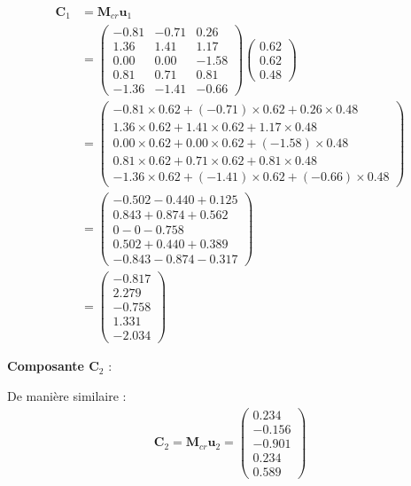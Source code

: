 \documentclass[11pt,a4paper]{article}
\begin{document}
\begin{align*}
\mathbf{C}_1 &= \mathbf{M}_{cr} \mathbf{u}_1 \\
&= \begin{pmatrix}
-0.81 & -0.71 & 0.26 \\
1.36 & 1.41 & 1.17 \\
0.00 & 0.00 & -1.58 \\
0.81 & 0.71 & 0.81 \\
-1.36 & -1.41 & -0.66
\end{pmatrix} \begin{pmatrix} 0.62 \\ 0.62 \\ 0.48 \end{pmatrix} \\
&= \begin{pmatrix}
-0.81 \times 0.62 + (-0.71) \times 0.62 + 0.26 \times 0.48 \\
1.36 \times 0.62 + 1.41 \times 0.62 + 1.17 \times 0.48 \\
0.00 \times 0.62 + 0.00 \times 0.62 + (-1.58) \times 0.48 \\
0.81 \times 0.62 + 0.71 \times 0.62 + 0.81 \times 0.48 \\
-1.36 \times 0.62 + (-1.41) \times 0.62 + (-0.66) \times 0.48
\end{pmatrix} \\
&= \begin{pmatrix}
-0.502 - 0.440 + 0.125 \\
0.843 + 0.874 + 0.562 \\
0 - 0 - 0.758 \\
0.502 + 0.440 + 0.389 \\
-0.843 - 0.874 - 0.317
\end{pmatrix} \\
&= \begin{pmatrix}
-0.817 \\
2.279 \\
-0.758 \\
1.331 \\
-2.034
\end{pmatrix}
\end{align*}

\textbf{Composante $\mathbf{C}_2$} :

De manière similaire :
\begin{align*}
\mathbf{C}_2 = \mathbf{M}_{cr} \mathbf{u}_2 = \begin{pmatrix}
0.234 \\
-0.156 \\
-0.901 \\
0.234 \\
0.589
\end{pmatrix}
\end{align*}
\end{document}
